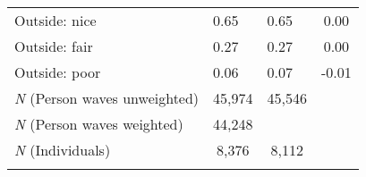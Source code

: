 \begin{center}
\begin{tabular}{lccccc}
Outside: nice & 0.65 &  & 0.65 &  & 0.00\\
Outside: fair & 0.27 &  & 0.27 &  & 0.00\\
Outside: poor & 0.06 &  & 0.07 &  & -0.01\\
\hline \textit{N} (Person waves unweighted) & \multicolumn{2}{c}{45,974} & \multicolumn{2}{c}{45,546} & \\
\textit{N} (Person waves weighted) & \multicolumn{2}{c}{44,248} & \multicolumn{2}{c}{} & \\
\textit{N} (Individuals) & \multicolumn{2}{c}{8,376} & \multicolumn{2}{c}{8,112} & \\
\noalign{\smallskip}\hline\end{tabular}\\
\end{center}
